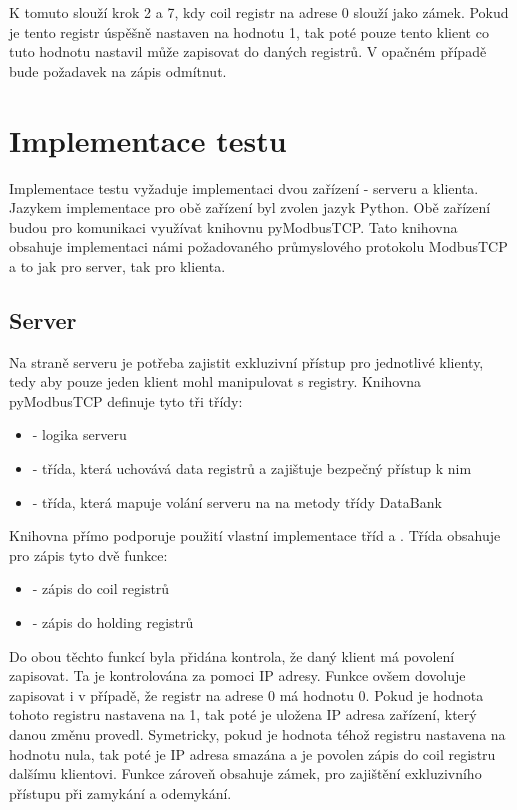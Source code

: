 K tomuto slouží krok 2 a 7, kdy coil registr na adrese 0 slouží jako zámek. Pokud je tento registr úspěšně nastaven na hodnotu 1, tak poté pouze tento klient co tuto hodnotu nastavil může zapisovat do daných registrů. V opačném případě bude požadavek na zápis odmítnut.

\section{Implementace testu}

Implementace testu vyžaduje implementaci dvou zařízení - serveru a klienta. Jazykem implementace pro obě zařízení byl zvolen jazyk Python. Obě zařízení budou pro komunikaci využívat knihovnu pyModbusTCP. Tato knihovna obsahuje implementaci námi požadovaného průmyslového protokolu ModbusTCP a to jak pro server, tak pro klienta.
 
\subsection{Server}

Na straně serveru je potřeba zajistit exkluzivní přístup pro jednotlivé klienty, tedy aby pouze jeden klient mohl manipulovat s registry. Knihovna pyModbusTCP definuje tyto tři třídy:

\begin{itemize}
    \item {} - logika serveru
    \item {} - třída, která uchovává data registrů a zajištuje bezpečný přístup k nim
    \item {} - třída, která mapuje volání serveru na na metody třídy DataBank
\end{itemize}

Knihovna přímo podporuje použití vlastní implementace tříd  a . Třída  obsahuje pro zápis tyto dvě funkce:

\begin{itemize}
    \item {} - zápis do coil registrů 
    \item {} - zápis do holding registrů
\end{itemize}

Do obou těchto funkcí byla přidána kontrola, že daný klient má povolení zapisovat. Ta je kontrolována za pomoci IP adresy. Funkce  ovšem dovoluje zapisovat i v případě, že registr na adrese 0 má hodnotu 0. Pokud je hodnota tohoto registru nastavena na 1, tak poté je uložena IP adresa zařízení, který danou změnu provedl. Symetricky, pokud je hodnota téhož registru nastavena na hodnotu nula, tak poté je IP adresa smazána a je povolen zápis do coil registru dalšímu klientovi. Funkce zároveň obsahuje zámek, pro zajištění exkluzivního přístupu při zamykání a odemykání. 

